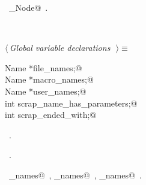 \documentclass{report}
\begin{document}
\begin{flushleft}
\begin{minipage}{\linewidth}
\vspace{-2ex}
\footnotesize\addtolength{\baselineskip}{-1ex}
\begin{list}{}{\setlength{\itemsep}{-\parsep}\setlength{\itemindent}{-\leftmargin}}
\item \NWtxtIdentsUsed\nobreak\  \verb@Scrap_Node@\nobreak\ .\end{list}
\end{minipage}\\[4ex]
\end{flushleft}
\begin{flushleft} \small
\begin{minipage}{\linewidth} \label{scrap192}
$\langle\,${\it Global variable declarations}\nobreak\ {\footnotesize {}}$\,\rangle\equiv$
\vspace{-1ex}
\begin{list}{}{} \item
\mbox{}\verb@extern Name *file_names;@\\
\mbox{}\verb@extern Name *macro_names;@\\
\mbox{}\verb@extern Name *user_names;@\\
\mbox{}\verb@extern int scrap_name_has_parameters;@\\
\mbox{}\verb@extern int scrap_ended_with;@\\
\mbox{}\verb@@{\NWsep}
\end{list}
\vspace{-1ex}
\footnotesize\addtolength{\baselineskip}{-1ex}
\begin{list}{}{\setlength{\itemsep}{-\parsep}\setlength{\itemindent}{-\leftmargin}}
\item \NWtxtMacroDefBy\ .
\item \NWtxtMacroRefIn\ .
\end{list}
\vspace{-2ex}
\footnotesize\addtolength{\baselineskip}{-1ex}
\begin{list}{}{\setlength{\itemsep}{-\parsep}\setlength{\itemindent}{-\leftmargin}}
\item \NWtxtIdentsDefed\nobreak\  \verb@file_names@\nobreak\ , \verb@macro_names@\nobreak\ , \verb@user_names@\nobreak\ .\end{list}

\end{minipage}
\end{flushleft}
\end{document}
